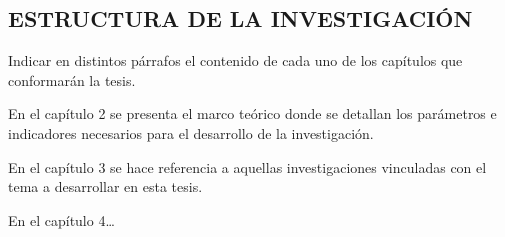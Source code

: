 \subsection{ESTRUCTURA DE LA INVESTIGACIÓN}

Indicar en distintos párrafos el contenido de cada uno de los capítulos que conformarán la tesis.

En el capítulo 2 se presenta el marco teórico donde se detallan los parámetros e indicadores necesarios para el desarrollo de la investigación.


En el capítulo 3 se hace referencia a aquellas investigaciones vinculadas con el tema a desarrollar en esta tesis.


En el capítulo 4…
